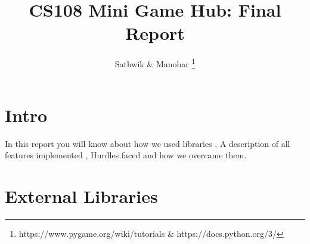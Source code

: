 \documentclass{report}
\begin{document}
\author{Sathwik \& Manohar \thanks {https://www.pygame.org/wiki/tutorials \& https://docs.python.org/3/}}
\title{CS108 Mini Game Hub: Final Report}
\maketitle
\tableofcontents
\clearpage

\section{Intro}
In this report you will know about how we used libraries , A description of all features implemented , Hurdles faced and how we overcame them.
\section{External Libraries}
\end{document}
